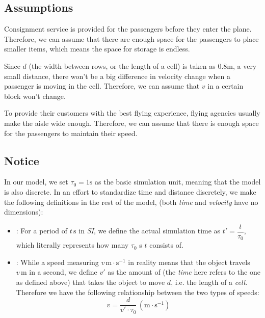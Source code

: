 \documentclass{article}
\theoremstyle{definition}
\theoremstyle{remark}
\numberwithin{equation}{section}
\begin{document}
	\subsection{Assumptions}
	\begin{enumerate}

		Consignment service is provided for the passengers before they enter the plane. Therefore, we can assume that there are enough space for the passengers to place smaller items, which means the space for storage is endless.

		Since $d$ (the width between rows, or the length of a cell) is taken as 0.8$\mathrm{m}$, a very small distance, there won't be a big difference in velocity change when a passenger is moving in the cell. Therefore, we can assume that $v$ in a certain block won't change.

		To provide their customers with the best flying experience, flying agencies usually make the aisle wide enough.  Therefore, we can assume that there is enough space for the passengers to maintain their speed.
	\end{enumerate}
	\subsection{Notice}
	In our model, we set \(\tau_0=1\mathrm{s}\) as the basic simulation unit, meaning that the model is also discrete. In an effort to standardize time and distance discretely, we make the following definitions in the rest of the model, (both \textit{time} and \textit{velocity} have no dimensions):
	\begin{itemize}
		\item {}:
			For a period of \(t\,\mathrm{s}\) in \textit{SI}, we define the actual simulation time as \(t'=\dfrac{t}{\tau_0}\), which literally represents how many \(\tau_0\) s \(t\) consists of.
		\item {}:
			While a speed measuring \(v\,\mathrm{m\cdot s^{-1}}\) in reality means that the object travels \(v\,\mathrm{m}\) in a second, we define  \(v'\) as the amount of  (the \textit{time} here refers to the one as defined above) that takes the object to move \(d\), i.e. the length of a \textit{cell}. Therefore we have the following relationship between the two types of speeds:\[v=\dfrac{d}{v'\cdot \tau_0}\,\left(\mathrm{m\cdot s^{-1}}\right)\]
	\end{itemize}
\end{document}
